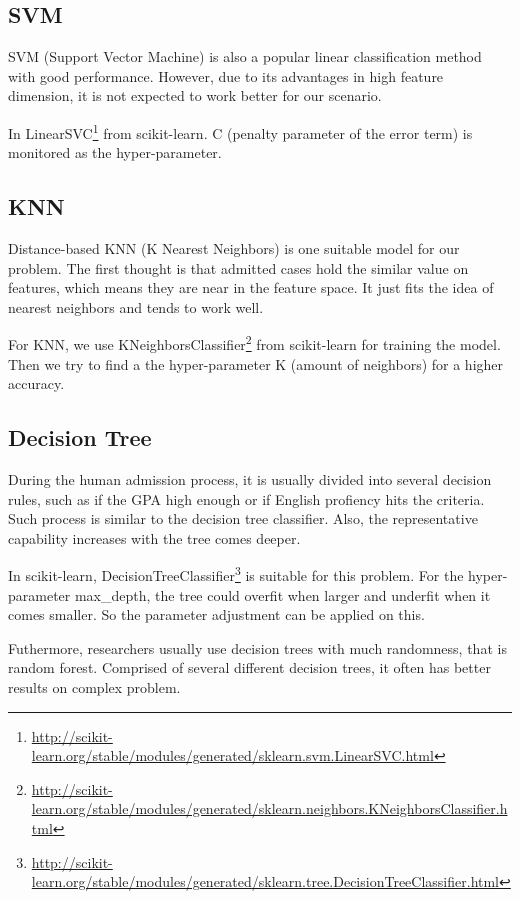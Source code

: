 \documentclass{article}
\begin{document}
\subsection{SVM}

SVM (Support Vector Machine) is also a popular linear classification method with good performance. However, due to its advantages in high feature dimension, it is not expected to work better for our scenario.

In LinearSVC\footnote{\url{http://scikit-learn.org/stable/modules/generated/sklearn.svm.LinearSVC.html}} from scikit-learn. C (penalty parameter of the error term) is monitored as the hyper-parameter.

\subsection{KNN}

Distance-based KNN (K Nearest Neighbors) is one suitable model for our problem. The first thought is that admitted cases hold the similar value on features, which means they are near in the feature space. It just fits the idea of nearest neighbors and tends to work well.

For KNN, we use KNeighborsClassifier\footnote{\url{http://scikit-learn.org/stable/modules/generated/sklearn.neighbors.KNeighborsClassifier.html}} from scikit-learn for training the model. Then we try to find a  the hyper-parameter K (amount of neighbors) for a higher accuracy.

\subsection{Decision Tree}

During the human admission process, it is usually divided into several decision rules, such as if the GPA high enough or if English profiency hits the criteria. Such process is similar to the decision tree classifier. Also, the representative capability increases with the tree comes deeper.

In scikit-learn, DecisionTreeClassifier\footnote{\url{http://scikit-learn.org/stable/modules/generated/sklearn.tree.DecisionTreeClassifier.html}} is suitable for this problem. For the hyper-parameter max\_depth, the tree could overfit when larger and underfit when it comes smaller. So the parameter adjustment can be applied on this.

Futhermore, researchers usually use decision trees with much randomness, that is random forest. Comprised of several different decision trees, it often has better results on complex problem.
\end{document}
